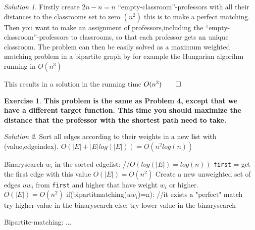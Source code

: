 \documentclass[a4paper,twoside=false,abstract=false,numbers=noenddot,
titlepage=false,headings=small,parskip=half,version=last]{scrartcl}
\theoremstyle{definition}
\newtheorem{exercise}{Exercise}
\theoremstyle{remark}
\newtheorem*{solution}{Solution}
\begin{document}
\begin{solution}
Firstly create $2n-n=n$ ``empty-classroom''-professors with all their distances to the classrooms set to zero $(n^2)$ this is to make a perfect matching.
Then you want to make an assignment of professors,including the ``empty-classroom''-professors to classrooms, so that each professor gets an unique classroom.
The problem can then be easily solved as a maximum weighted matching problem in a bipartite graph by for example the Hungarian algorihm running in $O(n^3)$

This results in a solution in the running time $O(n^3) \qed$
\end{solution}
\begin{exercise}
{\bf
This problem is the same as Problem 4, except that we have a different target function.
This time you should maximize the distance that the professor with the shortest path need to take.
}
\end{exercise}
\begin{solution}

Sort all edges according to their weights in a new list with (value,edgeindex). $O(|E|+|E|log(|E|))=O(n^2log(n))$

Binarysearch $w_i$ in the sorted edgelist: //$O(log(|E|)=log(n))$
    \verb+first+ = get the first edge with this value $O(|E|)=O(n^2)$
    Create a new unweighted set of edges $uw_i$ from \verb+first+ and higher that have weight $w_i$ or
    higher. $O(|E|)=O(n^2)$
    if(bipartitmatching($uw_i$)=n): //it exists a "perfect" match
        try higher value in the binarysearch
    else:
        try lower value in the binarysearch 

Bipartite-matching:
   ...     
    
\end{solution}
\end{document}
